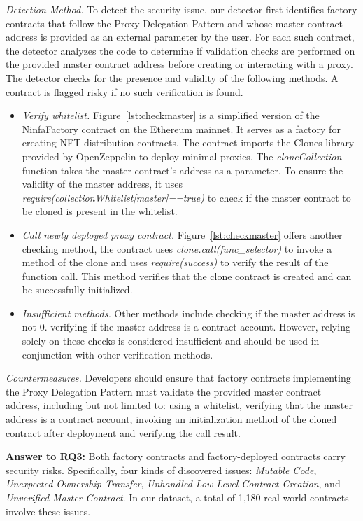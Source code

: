 \documentclass[acmsmall,screen]{acmart}
\begin{document}
	\textit{Detection Method.} To detect the security issue, our detector first identifies factory contracts that follow the Proxy Delegation Pattern and whose master contract address is provided as an external parameter by the user. For each such contract, the detector analyzes the code to determine if validation checks are performed on the provided master contract address before creating or interacting with a proxy. The detector checks for the presence and validity of the following methods. A contract is flagged risky if no such verification is found.
	\begin{itemize}[leftmargin=0.4cm,topsep=0.1cm]
		\item \textit{Verify whitelist.} Figure~\ref{lst:checkmaster} is a simplified version of the NinfaFactory contract on the Ethereum mainnet. It serves as a factory for creating NFT distribution contracts. The contract imports the Clones library provided by OpenZeppelin to deploy minimal proxies. The \textit{cloneCollection} function takes the master contract's address as a parameter. To ensure the validity of the master address, it uses \textit{require(collectionWhitelist[master]==true)} to check if the master contract to be cloned is present in the whitelist.
		\item \textit{Call newly deployed proxy contract.} Figure~\ref{lst:checkmaster} offers another checking method, the contract uses \textit{clone.call(func\_selector)} to invoke a method of the clone and uses \textit{require(success)} to verify the result of the function call. This method verifies that the clone contract is created and can be successfully initialized.
		\item \textit{Insufficient methods.} Other methods include  checking if the master address is not 0.  verifying if the master address is a contract account. However, relying solely on these checks is considered insufficient and should be used in conjunction with other verification methods.
	\end{itemize}

	\textit{Countermeasures.} Developers should ensure that factory contracts implementing the Proxy Delegation Pattern must validate the provided master contract address, including but not limited to: using a whitelist, verifying that the master address is a contract account, invoking an initialization method of the cloned contract after deployment and verifying the call result.


	\begin{answerbox}
		\textbf{Answer to RQ3:} Both factory contracts and factory-deployed contracts carry security risks. Specifically, four kinds of discovered issues: \textit{Mutable Code}, \textit{Unexpected Ownership Transfer}, \textit{Unhandled Low-Level Contract Creation}, and \textit{Unverified Master Contract}. In our dataset, a total of 1,180 real-world contracts involve these issues.
	\end{answerbox}
\end{document}
